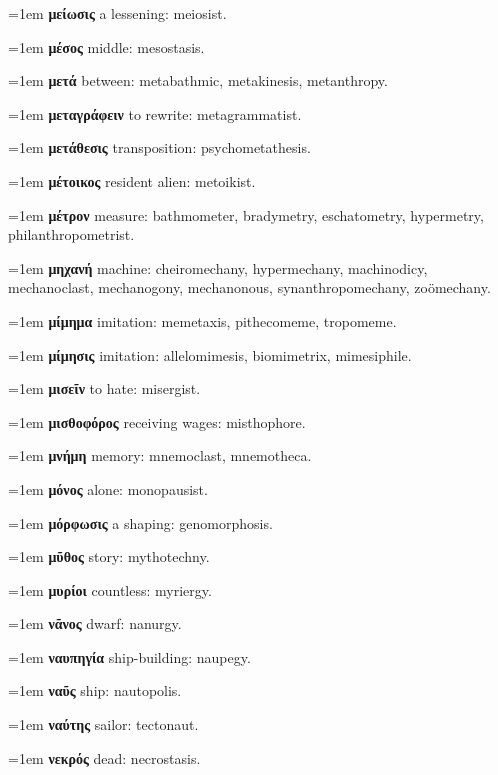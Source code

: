 \hangindent=1em \textbf{μείωσις} a lessening: meiosist.\par
\hangindent=1em \textbf{μέσος} middle: mesostasis.\par
\hangindent=1em \textbf{μετά} between: metabathmic, metakinesis, metanthropy.\par
\hangindent=1em \textbf{μεταγράφειν} to rewrite: metagrammatist.\par
\hangindent=1em \textbf{μετάθεσις} transposition: psychometathesis.\par
\hangindent=1em \textbf{μέτοικος} resident alien: metoikist.\par
\hangindent=1em \textbf{μέτρον} measure: bathmometer, bradymetry, eschatometry, hypermetry, philanthropometrist.\par
\hangindent=1em \textbf{μηχανή} machine: cheiromechany, hypermechany, machinodicy, mechanoclast, mechanogony, mechanonous, synanthropomechany, zoömechany.\par
\hangindent=1em \textbf{μίμημα} imitation: memetaxis, pithecomeme, tropomeme.\par
\hangindent=1em \textbf{μίμησις} imitation: allelomimesis, biomimetrix, mimesiphile.\par
\hangindent=1em \textbf{μισεῖν} to hate: misergist.\par
\hangindent=1em \textbf{μισθοφόρος} receiving wages: misthophore.\par
\hangindent=1em \textbf{μνήμη} memory: mnemoclast, mnemotheca.\par
\hangindent=1em \textbf{μόνος} alone: monopausist.\par
\hangindent=1em \textbf{μόρφωσις} a shaping: genomorphosis.\par
\hangindent=1em \textbf{μῦθος} story: mythotechny.\par
\hangindent=1em \textbf{μυρίοι} countless: myriergy.\par
\hangindent=1em \textbf{νᾶνος} dwarf: nanurgy.\par
\hangindent=1em \textbf{ναυπηγία} ship-building: naupegy.\par
\hangindent=1em \textbf{ναῦς} ship: nautopolis.\par
\hangindent=1em \textbf{ναύτης} sailor: tectonaut.\par
\hangindent=1em \textbf{νεκρός} dead: necrostasis.\par
